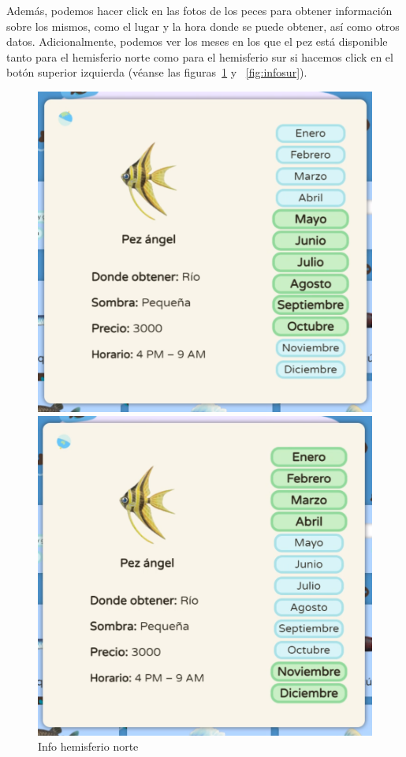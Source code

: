
\clearpage

Además, podemos hacer click en las fotos de los peces para obtener información sobre los mismos, como el lugar y la hora donde se puede obtener, así como otros datos. Adicionalmente, podemos ver los meses en los que el pez está disponible tanto para el hemisferio norte como para el hemisferio sur si hacemos click en el botón superior izquierda {(v\'eanse las figuras~\ref{fig:infonorte} y ~\ref{fig:infosur})}.\\

\begin{figure}[!htb]
	\begin{minipage}{0.48\textwidth}
		\centering
		\includegraphics[width=.9\linewidth]{img/cap9/6-pez-info-norte.png}
		\caption{Info hemisferio norte}
		\label{fig:infonorte}
	\end{minipage}\hfill
	\begin{minipage}{0.48\textwidth}
		\centering
		\includegraphics[width=.9\linewidth]{img/cap9/7-pez-info-sur.png}

\end{minipage}
\end{figure}
